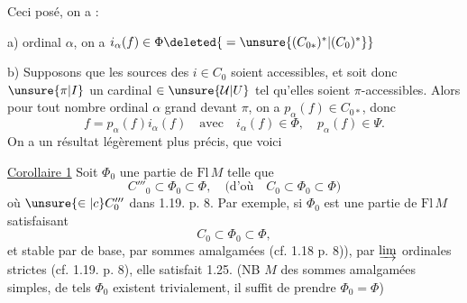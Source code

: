 Ceci posé, on a :

a)    ordinal $\alpha$, on a $i_\alpha(f)\in\Phi\deleted{{}=\unsure{(C_{0*})^*|(C_0)^*}}$

b) Supposons que les sources des $i\in C_0$ soient accessibles, et soit donc $\unsure{\pi|I}$ un cardinal $\in\unsure{\mathcal U|U}$ tel qu'elles soient $\pi$-accessibles. Alors pour tout nombre ordinal $\alpha$ grand devant $\pi$, on a $p_\alpha(f)\in C_{0*}$, donc
\[
f=p_\alpha(f)i_\alpha(f)\quad\text{avec}\quad i_\alpha(f)\in\Phi,\quad p_\alpha(f)\in\Psi.
\]
On a un résultat légèrement plus précis,  que voici

\uline{Corollaire 1}  Soit $\Phi_0$ une partie de $\mathrm{Fl}\,M$ telle que
\[
C'''_0\subset\Phi_0\subset\Phi,\quad\text{(d'où}\quad C_0\subset\Phi_0\subset\Phi\text{)}\tag*{(1.24)}
\]
où $\unsure{\in|c}C'''_0$   dans 1.19. p. 8. Par exemple, si $\Phi_0$ est une partie de $\mathrm{Fl}\,M$  satisfaisant 
\[
C_0\subset\Phi_0\subset\Phi,
\]
et stable par  de base, par  sommes amalgamées (cf. 1.18 p. 8)), par $\varinjlim$ ordinales strictes (cf. 1.19. p. 8), elle satisfait 1.25. (NB  $M$  des sommes amalgamées simples, de tels $\Phi_0$ existent trivialement, il suffit de prendre $\Phi_0=\Phi$)
